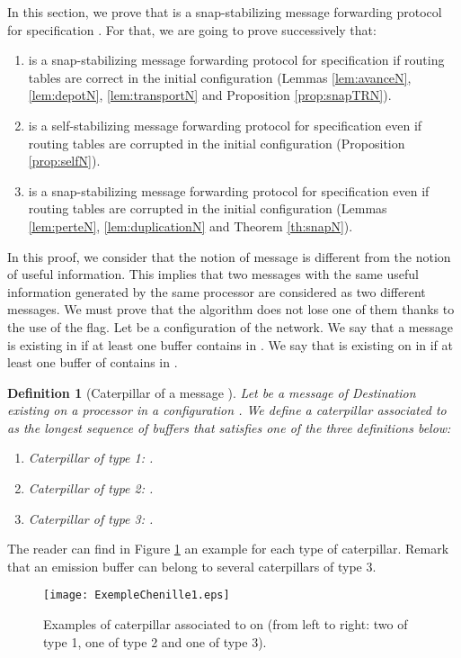 \documentclass[11pt]{article}
\newtheorem{definition}{Definition}
\begin{document}
In this section, we prove that \AN is a snap-stabilizing message forwarding protocol for specification .  For that, we are going to prove successively that:
\begin{enumerate}
\item \AN is a snap-stabilizing message forwarding protocol for specification  if routing tables are correct in the initial configuration (Lemmas \ref{lem:avanceN}, \ref{lem:depotN}, \ref{lem:transportN} and Proposition \ref{prop:snapTRN}). 
\item \AN is a self-stabilizing message forwarding protocol for specification  even if routing tables are corrupted in the initial configuration (Proposition \ref{prop:selfN}). 
\item \AN is a snap-stabilizing message forwarding protocol for specification  even if routing tables are corrupted in the initial configuration (Lemmas \ref{lem:perteN}, \ref{lem:duplicationN} and Theorem \ref{th:snapN}).
\end{enumerate}

In this proof, we consider that the notion of message is different from the notion of useful information. This implies that two messages with the same useful information generated by the same processor are considered as two different messages. We must prove that the algorithm does not lose one of them thanks to the use of the flag. Let  be a configuration of the network. We say that a message  is existing in  if at least one buffer contains  in . We say that  is existing on  in  if at least one buffer of  contains  in .

\begin{definition} [Caterpillar of a message ] \label{def:caterpillarN}
Let  be a message of Destination  existing on a processor  in a configuration . We define a caterpillar associated to  as the longest sequence of buffers that satisfies one of the three definitions below:
\begin{enumerate}
\item Caterpillar of type 1: . 
\item Caterpillar of type 2: . 
\item Caterpillar of type 3: . 
\end{enumerate}
\end{definition}

The reader can find in Figure \ref{fig:CaterpillarN} an example for each type of caterpillar. Remark that an emission buffer can belong to several caterpillars of type 3.

\begin{figure}
\begin{centering}
\texttt{[image: ExempleChenille1.eps]}
\par\end{centering}
\caption{\label{fig:CaterpillarN}Examples of caterpillar associated to  on  (from left to right: two of type 1, one of type 2 and one of type 3).}
\end{figure}
\end{document}
